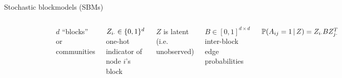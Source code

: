 \documentclass{beamer}
\theoremstyle{remark}
\begin{document}
\begin{frame}{Stochastic blockmodels (SBMs)}

    \begin{columns}

        \begin{figure}
            \includegraphics[width=\textwidth]{figures/assortative.png}
        \end{figure}


        $d$ ``blocks'' or communities

        $Z_{i \cdot} \in \{0, 1\}^d$ one-hot indicator of node $i$'s block

        \vspace{4mm}

        $Z$ is latent (i.e. unobserved)

        \vspace{4mm}

        $B \in [0, 1]^{d \times d}$ inter-block edge probabilities

        $\P[Z]{A_{ij} = 1} = Z_{i \cdot} B Z_{j \cdot}^T$

    \end{columns}

\end{frame}
\end{document}

